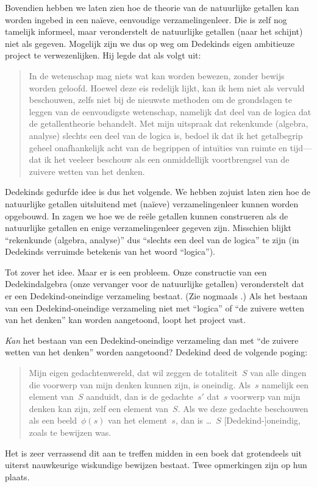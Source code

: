 \documentclass[../../../include/open-logic-section]{subfiles}
\begin{document}
Bovendien hebben we laten zien hoe de theorie van de natuurlijke
getallen kan worden ingebed in een na\"ieve, eenvoudige
verzamelingenleer. Die is zelf nog tamelijk informeel, maar
veronderstelt de natuurlijke getallen (naar het schijnt) niet als
gegeven. Mogelijk zijn we dus op weg om Dedekinds eigen ambitieuze
project te verwezenlijken. Hij legde dat als volgt uit:
\begin{quote}
	In de wetenschap mag niets wat kan worden bewezen, zonder bewijs
	worden geloofd. Hoewel deze eis redelijk lijkt, kan ik hem niet als
	vervuld beschouwen, zelfs niet bij de nieuwste methoden om de
	grondslagen te leggen van de eenvoudigste wetenschap, namelijk dat
	deel van de logica dat de getallentheorie behandelt. Met mijn
	uitspraak dat rekenkunde (algebra, analyse) slechts een deel van de
	logica is, bedoel ik dat ik het getalbegrip geheel onafhankelijk acht
	van de begrippen of intuïties van ruimte en tijd---dat ik het veeleer
	beschouw als een onmiddellijk voortbrengsel van de zuivere wetten van
	het denken.
	\citep[voorwoord]{Dedekind1888}
\end{quote}
Dedekinds gedurfde idee is dus het volgende. We hebben zojuist laten
zien hoe de natuurlijke getallen uitsluitend met (na\"ieve)
verzamelingenleer kunnen worden opgebouwd. In
 zagen we hoe we de reële getallen kunnen
construeren als de natuurlijke getallen en enige verzamelingenleer
gegeven zijn. Misschien blijkt ``rekenkunde (algebra, analyse)'' dus
``slechts een deel van de logica'' te zijn (in Dedekinds verruimde
betekenis van het woord ``logica'').

Tot zover het idee. Maar er is een probleem. Onze constructie van een
Dedekindalgebra (onze vervanger voor de natuurlijke getallen)
veronderstelt dat er een Dedekind-oneindige verzameling bestaat. (Zie
nogmaals
.) Als het
bestaan van een Dedekind-oneindige verzameling niet met ``logica'' of
``de zuivere wetten van het denken'' kan worden aangetoond, loopt het
project vast.

\emph{Kan} het bestaan van een Dedekind-oneindige verzameling dan met
``de zuivere wetten van het denken'' worden aangetoond? Dedekind deed de
volgende poging:
\begin{quote}
  Mijn eigen gedachtenwereld, dat wil zeggen de totaliteit~$S$ van alle
  dingen die voorwerp van mijn denken kunnen zijn, is oneindig. Als~$s$
  namelijk een element van~$S$ aanduidt, dan is de gedachte~$s'$ dat~$s$
  voorwerp van mijn denken kan zijn, zelf een element van~$S$. Als we
  deze gedachte beschouwen als een beeld~$\phi(s)$ van het element~$s$,
  dan is \dots~$S$ [Dedekind-]oneindig, zoals te bewijzen was.
	\citep[\S66]{Dedekind1888}
\end{quote}
Het is zeer verrassend dit aan te treffen midden in een boek dat
grotendeels uit uiterst nauwkeurige wiskundige bewijzen bestaat. Twee
opmerkingen zijn op hun plaats.
\end{document}
